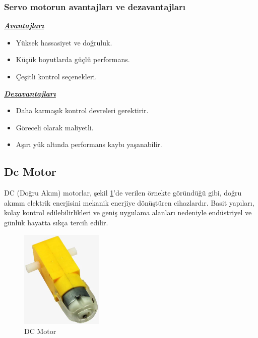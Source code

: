 \subsubsection{Servo motorun avantajları ve dezavantajları}
\textbf{\textit{\underline{Avantajları}}}
\begin{itemize}   
\item Yüksek hassasiyet ve doğruluk.
\item Küçük boyutlarda güçlü performans.
\item Çeşitli kontrol seçenekleri.
\end{itemize}
\par\textbf{\textit{\underline{Dezavantajları}}}
\begin{itemize}   
\item Daha karmaşık kontrol devreleri gerektirir.
\item Göreceli olarak maliyetli.
\item Aşırı yük altında performans kaybı yaşanabilir.
\end{itemize}

\subsection{Dc Motor}

    DC (Doğru Akım) motorlar, şekil \ref{fig:22}'de verilen örnekte göründüğü gibi, doğru akımın elektrik enerjisini mekanik enerjiye dönüştüren cihazlardır. Basit yapıları, kolay kontrol edilebilirlikleri ve geniş uygulama alanları nedeniyle endüstriyel ve günlük hayatta sıkça tercih edilir.
\begin{figure}[H]
\centering
\includegraphics[width=0.35\textwidth]{Resimler/22.png}
\caption{DC Motor}
\label{fig:22}
\end{figure}

